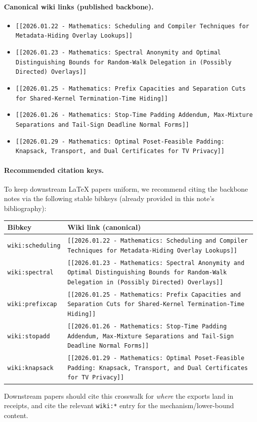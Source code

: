 \documentclass[11pt]{article}
\begin{document}
\paragraph{Canonical wiki links (published backbone).}
\begin{itemize}[leftmargin=1.2em]
\item \texttt{[[2026.01.22 - Mathematics: Scheduling and Compiler Techniques for Metadata-Hiding Overlay Lookups]]}
\item \texttt{[[2026.01.23 - Mathematics: Spectral Anonymity and Optimal Distinguishing Bounds for Random-Walk Delegation in (Possibly Directed) Overlays]]}
\item \texttt{[[2026.01.25 - Mathematics: Prefix Capacities and Separation Cuts for Shared-Kernel Termination-Time Hiding]]}
\item \texttt{[[2026.01.26 - Mathematics: Stop-Time Padding Addendum, Max-Mixture Separations and Tail-Sign Deadline Normal Forms]]}
\item \texttt{[[2026.01.29 - Mathematics: Optimal Poset-Feasible Padding: Knapsack, Transport, and Dual Certificates for TV Privacy]]}
\end{itemize}

\paragraph{Recommended citation keys.}
To keep downstream \LaTeX{} papers uniform, we recommend citing the backbone notes via the following stable bibkeys (already provided in this note's bibliography):
\begin{center}
\small
\begin{tabularx}{0.98\linewidth}{@{}lX@{}}
\toprule
Bibkey & Wiki link (canonical) \\
\midrule
\texttt{wiki:scheduling} & \texttt{[[2026.01.22 - Mathematics: Scheduling and Compiler Techniques for Metadata-Hiding Overlay Lookups]]} \\
\texttt{wiki:spectral} & \texttt{[[2026.01.23 - Mathematics: Spectral Anonymity and Optimal Distinguishing Bounds for Random-Walk Delegation in (Possibly Directed) Overlays]]} \\
\texttt{wiki:prefixcap} & \texttt{[[2026.01.25 - Mathematics: Prefix Capacities and Separation Cuts for Shared-Kernel Termination-Time Hiding]]} \\
\texttt{wiki:stopadd} & \texttt{[[2026.01.26 - Mathematics: Stop-Time Padding Addendum, Max-Mixture Separations and Tail-Sign Deadline Normal Forms]]} \\
\texttt{wiki:knapsack} & \texttt{[[2026.01.29 - Mathematics: Optimal Poset-Feasible Padding: Knapsack, Transport, and Dual Certificates for TV Privacy]]} \\
\bottomrule
\end{tabularx}
\end{center}
Downstream papers should cite this crosswalk for \emph{where} the exports land in receipts, and cite the relevant \texttt{wiki:*} entry for the mechanism/lower-bound content.
\end{document}
